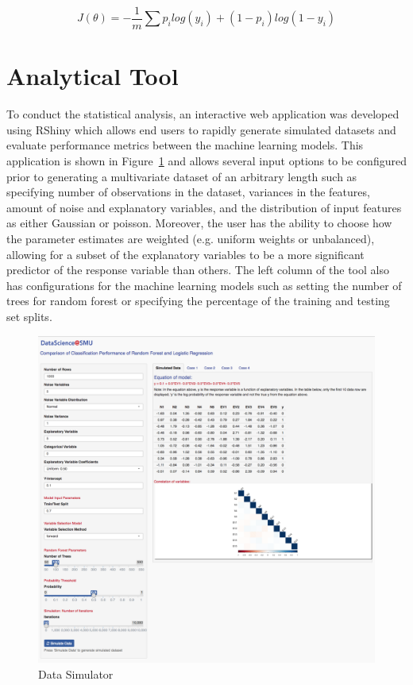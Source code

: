\documentclass{llncs}
\begin{document}
\begin{equation}
J(\theta) = -\frac{1}{m}\sum p_{i}log(y_{i}) + (1-p_{i})log(1-y_{i})
\end{equation}

 
\section{Analytical Tool}

To conduct the statistical analysis, an interactive web application was developed using RShiny which allows end users to rapidly generate simulated datasets and evaluate performance metrics between the machine learning models. This application is shown in Figure~\ref{fig:rshiny} and allows several input options to be configured prior to generating a multivariate dataset of an arbitrary length such as specifying number of observations in the dataset, variances in the features, amount of noise and explanatory variables, and the distribution of input features as either Gaussian or poisson. Moreover, the user has the ability to choose how the parameter estimates are weighted (e.g. uniform weights or unbalanced), allowing for a subset of the explanatory variables to be a more significant predictor of the response variable than others. The left column of the tool also has configurations for the machine learning models such as setting the number of trees for random forest or specifying the percentage of the training and testing set splits.

\begin{figure}
\centering
\includegraphics[width=1.0\textwidth]{full-tool.png}
\caption{Data Simulator}
\label{fig:rshiny}
\end{figure}
\end{document}
